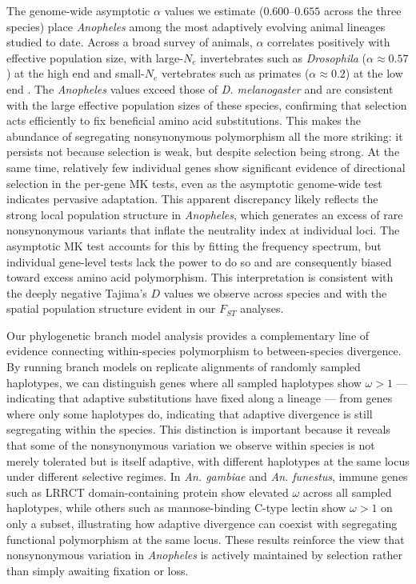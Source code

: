 The genome-wide asymptotic $\alpha$ values we estimate
($0.600$--$0.655$ across the three species)
place \textit{Anopheles} among the most adaptively evolving animal lineages studied to date.
Across a broad survey of animals,
$\alpha$ correlates positively with effective population size,
with large-$N_e$ invertebrates such as \textit{Drosophila} ($\alpha \approx 0.57$)
at the high end and small-$N_e$ vertebrates such as primates ($\alpha \approx 0.2$)
at the low end \citep{Galtier_2016}.
The \textit{Anopheles} values exceed those of \textit{D. melanogaster}
and are consistent with the large effective population sizes of these species,
confirming that selection acts efficiently to fix beneficial amino acid substitutions.
This makes the abundance of segregating nonsynonymous polymorphism all the more striking:
it persists not because selection is weak,
but despite selection being strong.
At the same time, relatively few individual genes
show significant evidence of directional selection in the per-gene MK tests,
even as the asymptotic genome-wide test indicates pervasive adaptation.
This apparent discrepancy likely reflects the strong local population structure
in \textit{Anopheles}, which generates an excess of rare nonsynonymous variants
that inflate the neutrality index at individual loci.
The asymptotic MK test accounts for this by fitting the frequency spectrum,
but individual gene-level tests lack the power to do so
and are consequently biased toward excess amino acid polymorphism.
This interpretation is consistent with the deeply negative Tajima's $D$ values
we observe across species
and with the spatial population structure evident in our $F_{ST}$ analyses.


Our phylogenetic branch model analysis provides a complementary line of evidence
connecting within-species polymorphism to between-species divergence.
By running branch models on replicate alignments of randomly sampled haplotypes,
we can distinguish genes where all sampled haplotypes show $\omega > 1$ ---
indicating that adaptive substitutions have fixed along a lineage ---
from genes where only some haplotypes do,
indicating that adaptive divergence is still segregating within the species.
This distinction is important because it reveals
that some of the nonsynonymous variation we observe within species
is not merely tolerated but is itself adaptive,
with different haplotypes at the same locus under different selective regimes.
In \textit{An. gambiae} and \textit{An. funestus},
immune genes such as LRRCT domain-containing protein
show elevated $\omega$ across all sampled haplotypes,
while others such as mannose-binding C-type lectin
show $\omega > 1$ on only a subset,
illustrating how adaptive divergence can coexist
with segregating functional polymorphism at the same locus.
These results reinforce the view that nonsynonymous variation
in \textit{Anopheles} is actively maintained by selection
rather than simply awaiting fixation or loss.

